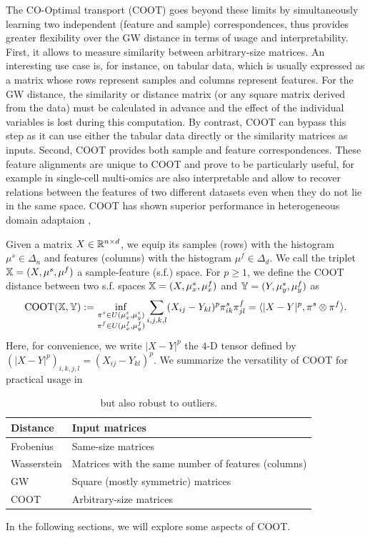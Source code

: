 The CO-Optimal transport (COOT) \citep{Redko20,Chowdhury21b} goes beyond these limits by
simultaneously learning two independent (feature and sample) correspondences,
thus provides greater flexibility over the GW distance in terms of usage and interpretability.
First, it allows to measure similarity between arbitrary-size matrices. An interesting use case is,
for instance, on tabular data, which is usually expressed as a matrix whose rows represent samples
and columns represent features. For the GW distance, the similarity or distance matrix
(or any square matrix derived from the data) must be calculated in advance and
the effect of the individual variables is lost during this computation. By contrast,
COOT can bypass this step as it can use either the tabular data directly or
the similarity matrices as inputs. Second, COOT provides both sample and feature correspondences.
These feature alignments are unique to COOT and prove to be particularly useful,
for example in single-cell multi-omics \citep{Demetci20b}
are also interpretable and allow to recover relations between the features of
two different datasets even when they do not lie in the same space.
COOT has shown superior performance in heterogeneous domain adaptaion \citep{Redko20},

Given a matrix $X \in \mathbb R^{n \times d}$,
we equip its samples (rows) with the histogram $\mu^s \in \Delta_n$ and features (columns)
with the histogram $\mu^f \in \Delta_d$.
We call the triplet $\mathbb X = (X, \mu^s, \mu^f)$ a sample-feature (s.f.) space.
For $p \geq 1$, we define the COOT distance between two s.f. spaces
$\mathbb X = (X, \mu_x^s, \mu_x^f)$ and $\mathbb Y = (Y, \mu_y^s, \mu_y^f)$ as
\begin{align}
    \text{COOT}(\mathbb X, \mathbb Y) :=
    \inf_{\substack{\pi^s \in U(\mu_x^s, \mu_y^s) \\ \pi^f \in U(\mu_x^f, \mu_y^f)}}
    \sum_{i,j,k,l} (X_{ij} - Y_{kl})^p \pi^s_{ik} \pi^f_{jl}
    = \langle |X - Y|^p, \pi^s \otimes \pi^f \rangle.
\end{align}
Here, for convenience, we write $|X - Y|^p$ the $4$-D tensor defined by
$(|X - Y|^p)_{i,k,j,l} = (X_{ij} - Y_{kl})^p$. We summarize the versatility of COOT for practical
usage in 
\begin{table}[h]
	\centering
		\begin{tabular}{|l|l|}
    \hline
    Distance & Input matrices \\
    \hline
    Frobenius & Same-size matrices \\
    Wasserstein & Matrices with the same number of features (columns) \\
    GW & Square (mostly symmetric) matrices \\
    COOT & Arbitrary-size matrices \\
    \hline
		\end{tabular}
		\caption{but also robust to outliers.
    \label{t:comparisons}}
\end{table}
In the following sections, we will explore some aspects of COOT.

